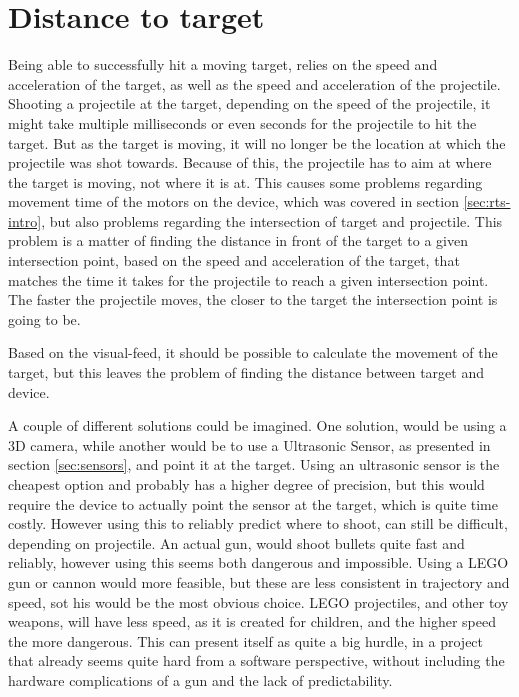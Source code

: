 
\section{Distance to target}
Being able to successfully hit a moving target, relies on the speed and acceleration of the target, as well as the speed and acceleration of the projectile.
Shooting a projectile at the target, depending on the speed of the projectile, it might take multiple milliseconds or even seconds for the projectile to hit the target.
But as the target is moving, it will no longer be the location at which the projectile was shot towards.
Because of this, the projectile has to aim at where the target is moving, not where it is at.
This causes some problems regarding movement time of the motors on the device, which was covered in section \ref{sec:rts-intro}, but also problems regarding the intersection of target and projectile.
This problem is a matter of finding the distance in front of the target to a given intersection point, based on the speed and acceleration of the target, that matches the time it takes for the projectile to reach a given intersection point. 
The faster the projectile moves, the closer to the target the intersection point is going to be.

Based on the visual-feed, it should be possible to calculate the movement of the target, but this leaves the problem of finding the distance between target and device.


A couple of different solutions could be imagined.
One solution, would be using a 3D camera, while another would be to use a Ultrasonic Sensor, as presented in section \ref{sec:sensors}, and point it at the target.
Using an ultrasonic sensor is the cheapest option and probably has a higher degree of precision, but this would require the device to actually point the sensor at the target, which is quite time costly.
However using this to reliably predict where to shoot, can still be difficult, depending on projectile.
An actual gun, would shoot bullets quite fast and reliably, however using this seems both dangerous and impossible.
Using a LEGO gun or cannon would more feasible, but these are less consistent in trajectory and speed, sot his would be the most obvious choice.
LEGO projectiles, and other toy weapons, will have less speed, as it is created for children, and the higher speed the more dangerous.
This can present itself as quite a big hurdle, in a project that already seems quite hard from a software perspective, without including the hardware complications of a gun and the lack of predictability.


